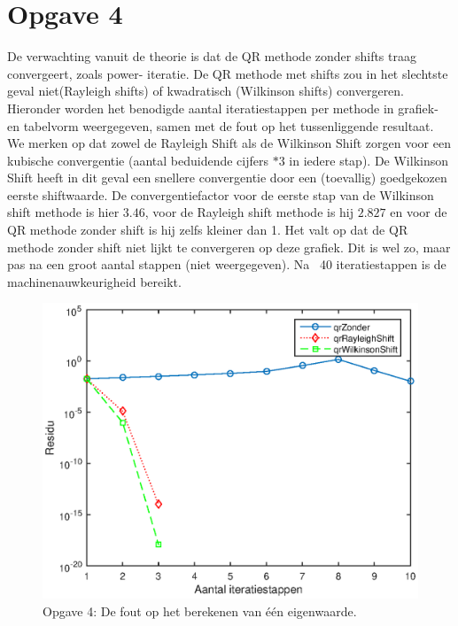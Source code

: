 \documentclass[]{article}
\newcommand{\opgave}[1]{\section*{Opgave #1}}
\begin{document}
\opgave{4}

De verwachting vanuit de theorie is dat de QR methode zonder shifts traag convergeert, zoals power- iteratie. De QR methode met shifts zou in het slechtste geval niet(Rayleigh shifts) of kwadratisch (Wilkinson shifts) convergeren. Hieronder worden het benodigde aantal iteratiestappen per methode in grafiek- en tabelvorm weergegeven, samen met de fout op het tussenliggende resultaat. We merken op dat  zowel de Rayleigh Shift als de Wilkinson Shift zorgen voor een kubische convergentie (aantal beduidende cijfers $* 3$ in iedere stap). 
De Wilkinson Shift heeft in dit geval een snellere convergentie door een (toevallig) goedgekozen eerste shiftwaarde. De convergentiefactor voor de eerste stap van de Wilkinson shift methode is hier $3.46$, voor de Rayleigh shift methode is hij $2.827$ en voor de QR methode zonder shift is hij zelfs kleiner dan 1. Het valt op dat de QR methode zonder shift niet lijkt te convergeren op deze grafiek. Dit is wel zo, maar pas na een groot aantal stappen (niet weergegeven). Na ~40 iteratiestappen is de machinenauwkeurigheid bereikt. 

\begin{figure}
\begin{center}
\includegraphics[width=1\textwidth]{opgave4.eps}
\end{center}
\caption{Opgave 4: De fout op het berekenen van \'e\'en eigenwaarde.}
\label{figuurtje}
\end{figure}
\end{document}
